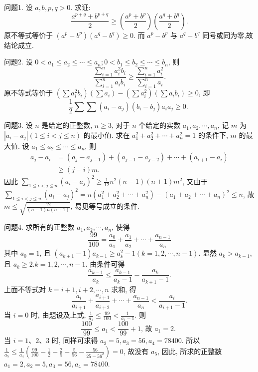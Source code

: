 
问题1. 设 $a, b, p, q>0$. 求证:
$$
\frac{a^{p+q}+b^{p+q}}{2} \geqslant\left(\frac{a^p+b^p}{2}\right)\left(\frac{a^q+b^q}{2}\right) .
$$
原不等式等价于 $\left(a^p-b^p\right)\left(a^q-b^q\right) \geqslant 0$.
而 $a^p-b^p$ 与 $a^q-b^q$ 同号或同为零,故结论成立.



问题2. 设 $0<a_1 \leqslant a_2 \leqslant \cdots \leqslant a_n ; 0<b_1 \leqslant b_2 \leqslant \cdots \leqslant b_n$, 则
$$
\frac{\sum_{i=1}^n a_i^2 b_i}{\sum_{i=1}^n a_i b_i} \geqslant \frac{\sum_{i=1}^n a_i^2}{\sum_{i=1}^n a_i} .
$$
原不等式等价于 $\left(\sum a_i^2 b_i\right)\left(\sum a_i\right)-\left(\sum a_i^2\right)\left(\sum a_i b_i\right) \geqslant 0$, 即
$$
\frac{1}{2} \sum \sum\left(a_i-a_j\right)\left(b_i-b_j\right) a_i a_j \geqslant 0 \text {. }
$$



问题3. 设 $n$ 是给定的正整数, $n \geqslant 3$, 对于 $n$ 个给定的实数 $a_1, a_2, \cdots, a_n$, 记 $m$ 为 $\left|a_i-a_j\right|(1 \leqslant i<j \leqslant n)$ 的最小值.
求在 $a_1^2+a_2^2+\cdots+a_n^2=1$ 的条件下, $m$ 的最大值.
设 $a_1 \leqslant a_2 \leqslant \cdots \leqslant a_n$, 则
$$
\begin{aligned}
a_j-a_i & =\left(a_j-a_{j-1}\right)+\left(a_{j-1}-a_{j-2}\right)+\cdots+\left(a_{i+1}-a_i\right) \\
& \geqslant(j-i) m .
\end{aligned}
$$
因此 $\sum_{1 \leqslant i<j \leqslant n}\left(a_i-a_j\right)^2 \geqslant \frac{1}{12} n^2(n-1)(n+1) m^2$,
又由于 $\sum_{1 \leqslant i<j \leqslant n}\left(a_i-a_j\right)^2=n\left(a_1^2+a_2^2+\cdots+a_n^2\right)-\left(a_1+a_2+\cdots+a_n\right)^2 \leqslant n$, 故 $m \leqslant \sqrt{\frac{12}{(n-1) n(n+1)}}$, 易见等号成立的条件.



问题4. 求所有的正整数 $a_1, a_2, \cdots, a_n$, 使得
$$
\frac{99}{100}=\frac{a_0}{a_1}+\frac{a_1}{a_2}+\cdots+\frac{a_{n-1}}{a_n}
$$
其中 $a_0=1$, 且 $\left(a_{k+1}-1\right) a_{k-1} \geqslant a_k^2-1(k=1,2, \cdots, n-1)$.
显然 $a_k>a_{k-1}$, 且 $a_k \geqslant 2 . k=1,2, \cdots, n-1$.
由条件可得
$$
\frac{a_{k-1}}{a_k} \leqslant \frac{a_{k-1}}{a_k-1}-\frac{a_k}{a_{k+1}-1} .
$$
上面不等式对 $k=i+1, i+2, \cdots, n$ 求和, 得
$$
\frac{a_i}{a_{i+1}}+\frac{a_{i+1}}{a_{i+2}}+\cdots+\frac{a_{n-1}}{a_n}<\frac{a_i}{a_{i+1}-1} .
$$
当 $i=0$ 时, 由题设及上式, $\frac{1}{a_1} \leqslant \frac{99}{100}<\frac{1}{a_1-1}$. 则
$$
\frac{100}{99} \leqslant a_1<\frac{100}{99}+1 \text {, 故 } a_1=2 \text {. }
$$
当 $i=1 、 2 、 3$ 时, 同样可求得 $a_2=5, a_3=56, a_4=78400$.
所以 $\frac{1}{a_5} \leqslant \frac{1}{a_4}\left(\frac{99}{100}-\frac{1}{2}-\frac{2}{5}-\frac{5}{56}-\frac{56}{25-56^2}\right)=0$, 故没有 $a_5$, 因此, 所求的正整数 $a_1=2, a_2=5, a_3=56, a_4=78400$.



